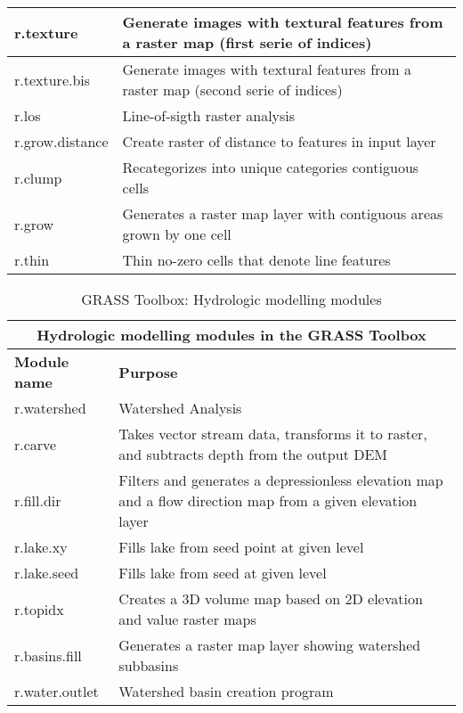 \begin{table}[ht]
\begin{tabular}{|p{4cm}|p{12cm}|}
  \hline r.texture & Generate images with textural features from a raster map
  (first serie of indices)\\
  \hline r.texture.bis & Generate images with textural features from a raster
  map (second serie of indices)\\
  \hline r.los & Line-of-sigth raster analysis \\
  \hline r.grow.distance & Create raster of distance to features in input layer \\
  \hline r.clump & Recategorizes into unique categories contiguous cells \\
  \hline r.grow & Generates a raster map layer with contiguous areas grown by
  one cell\\
  \hline r.thin & Thin no-zero cells that denote line features \\
\hline
\end{tabular}
\end{table}

\begin{table}[ht]
\centering
\caption{GRASS Toolbox: Hydrologic modelling modules}\medskip
 \begin{tabular}{|p{4cm}|p{12cm}|}
  \hline \multicolumn{2}{|c|}{\textbf{Hydrologic modelling modules in the GRASS
  Toolbox}} \\
  \hline \textbf{Module name} & \textbf{Purpose} \\
  \hline r.watershed & Watershed Analysis \\
  \hline r.carve & Takes vector stream data, transforms it to raster, and
  subtracts depth from the output DEM \\
  \hline r.fill.dir & Filters and generates a depressionless elevation map
  and a flow direction map from a given elevation layer \\
  \hline r.lake.xy & Fills lake from seed point at given level \\
  \hline r.lake.seed & Fills lake from seed at given level \\
  \hline r.topidx & Creates a 3D volume map based on 2D elevation and value
  raster maps \\
  \hline r.basins.fill & Generates a raster map layer showing watershed
  subbasins \\
  \hline r.water.outlet & Watershed basin creation program \\
\hline
\end{tabular}
\end{table}

